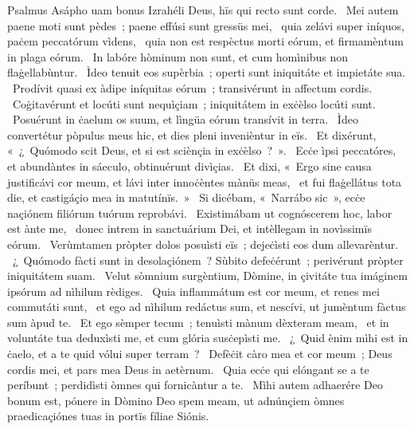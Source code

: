 { Psalmus Asápho}
{%
uam bonus Izrahéli Deus, hïs qui recto sunt corde. 
~Mei autem paene moti sunt pèdes~; paene effúsi sunt gressüs mei, 
~quia zelávi super iníquos, paċem peccatórum vìdens, 
~quia non est respèctus morti eórum, et firmamèntum in plaga eórum. 
~In labóre hòminum non sunt, et cum homìnibus non flaġellabùntur. 
~Ìdeo tenuit eos supèrbia~; operti sunt iniquitáte et impietáte sua. 
~Prodívit quasi ex àdipe iníquitas eórum~; transivérunt in affectum cordis. 
~Coġitavérunt et locúti sunt nequìçiam~; iniquitátem in exċèlso locúti sunt. 
~Posuérunt in ċaelum os suum, et lìngüa eórum transívit in terra. 
~Ìdeo convertétur pòpulus meus hic, et dies pleni invenièntur in eïs. 
~Et dixérunt, «~¿~Quómodo scit Deus, et si est sciènçia in exċèlso~?~». 
~Ecċe ìpsi peccatóres, et abundàntes in sáeculo, obtinuérunt divìçias. 
~Et dixi, «~Ergo sine causa justificávi cor meum, et lávi inter innoċèntes mànüs meas, 
~et fui flaġellátus tota die, et castigáçio mea in matutínïs.~»
~Si dicébam, «~Narrábo sic~», ecċe naçiónem filiórum tuórum reprobávi. 
~Existimábam ut cognóscerem hoc, labor est ànte me, 
~donec intrem in sanctuárium Dei, et intèllegam in novìssimïs eórum. 
~Verùmtamen pròpter dolos posuìsti eïs~; dejeċìsti eos dum allevarèntur. 
~¿~Quómodo fàcti sunt in desolaçiónem~? Sùbito defeċérunt~; perivérunt pròpter iniquitátem suam. 
~Velut sòmnium surgèntium, Dòmine, in çivitáte tua imáginem ipsórum ad nìhilum rèdiges. 
~Quia inflammátum est cor meum, et renes mei commutáti sunt, 
~et ego ad nìhilum redáctus sum, et nescívi, ut jumèntum fàctus sum àpud te. 
~Et ego sèmper tecum~; tenuìsti mànum dèxteram meam, 
~et in voluntáte tua deduxìsti me, et cum glória susċepìsti me. 
~¿~Quid ènim mìhi est in ċaelo, et a te quid vólui super terram~? 
~Defèċit càro mea et cor meum~; Deus cordis mei, et pars mea Deus in aetèrnum. 
~Quia ecċe qui elóngant se a te períbunt~; perdidìsti òmnes qui fornicàntur a te. 
~Mìhi autem adhaerére Deo bonum est, pónere in Dòmino Deo spem meam, ut adnúnçiem òmnes praedicaçiónes tuas in portïs fíliae Siónis. 
}

